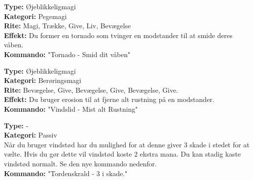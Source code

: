 \begin{vind*}[Tornado]
\textbf{Type:} Øjeblikkeligmagi\\
\textbf{Kategori:} Pegemagi\\
\textbf{Rite:} Magi, Trække, Give, Liv, Bevægelse\\
\textbf{Effekt:} Du former en tornado som tvinger en modstander til at smide deres våben.\\
\textbf{Kommando:} "Tornado - Smid dit våben"
\end{vind*}

\begin{vind*}[Vindslid]
\textbf{Type:} Øjeblikkeligmagi\\
\textbf{Kategori:} Berøringsmagi\\
\textbf{Rite:} Bevægelse, Give, Bevægelse, Give, Bevægelse, Give.\\
\textbf{Effekt:} Du bruger erosion til at fjerne alt rustning på en modstander.\\
\textbf{Kommando:} "Vindslid - Mist alt Rustning"
\end{vind*}

\begin{vind*}[Tordenskrald]
\textbf{Type:} -\\
\textbf{Kategori:} Passiv\\
Når du bruger vindstød har du mulighed for at denne giver 3 skade i stedet for at vælte. Hvis du gør dette vil vindstød koste 2 ekstra mana. Du kan stadig kaste vindstød normalt. Se den nye kommando nedenfor.\\
\textbf{Kommando:} "Tordenskrald - 3 i skade."
\end{vind*}
